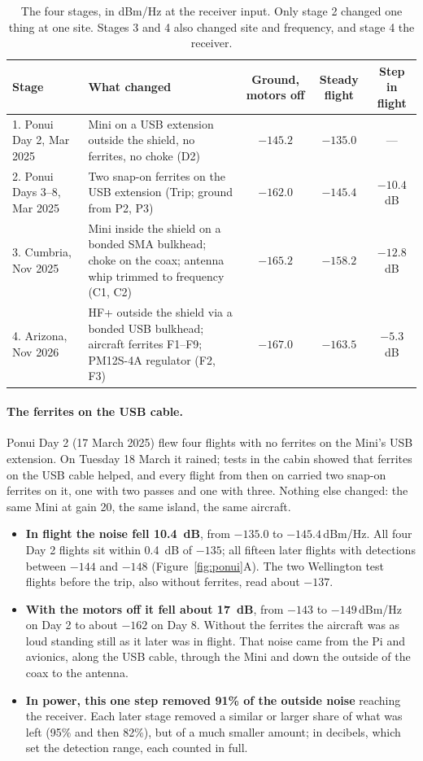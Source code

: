 \documentclass[11pt]{article}
\newcommand{\dBmHz}{\,dBm/Hz}
\begin{document}
\begin{table}[!htbp]
\centering\small
\begin{tabularx}{\linewidth}{@{}l X c c c@{}}
\toprule
Stage & What changed & Ground, motors off & Steady flight & Step in flight \\
\midrule
1. Ponui Day 2, Mar 2025 & Mini on a USB extension outside the shield, no ferrites, no choke (D2) & $-145.2$ & $-135.0$ & --- \\
2. Ponui Days 3--8, Mar 2025 & Two snap-on ferrites on the USB extension (Trip; ground from P2, P3) & $-162.0$ & $-145.4$ & $-10.4$ dB \\
3. Cumbria, Nov 2025 & Mini inside the shield on a bonded SMA bulkhead; choke on the coax; antenna whip trimmed to frequency (C1, C2) & $-165.2$ & $-158.2$ & $-12.8$ dB \\
4. Arizona, Nov 2026 & HF+ outside the shield via a bonded USB bulkhead; aircraft ferrites F1--F9; PM12S-4A regulator (F2, F3) & $-167.0$ & $-163.5$ & $-5.3$ dB \\
\bottomrule
\end{tabularx}
\caption{The four stages, in dBm/Hz at the receiver input. Only stage 2 changed one thing at one
site. Stages 3 and 4 also changed site and frequency, and stage 4 the receiver.}
\label{tab:history}
\end{table}

\paragraph{The ferrites on the USB cable.} Ponui Day 2 (17 March 2025) flew four flights with no
ferrites on the Mini's USB extension. On Tuesday 18 March it rained; tests in the cabin showed that
ferrites on the USB cable helped, and every flight from then on carried two snap-on ferrites on it,
one with two passes and one with three. Nothing else changed: the same Mini at gain 20, the same
island, the same aircraft.
\begin{itemize}
\item \textbf{In flight the noise fell 10.4~dB}, from $-135.0$ to $-145.4$\dBmHz{}. All four Day 2
flights sit within 0.4~dB of $-135$; all fifteen later flights with detections between $-144$ and
$-148$ (Figure~\ref{fig:ponui}A). The two Wellington test flights before the trip, also without
ferrites, read about $-137$.
\item \textbf{With the motors off it fell about 17~dB}, from $-143$ to $-149$\dBmHz{} on Day 2 to
about $-162$ on Day 8. Without the ferrites the aircraft was as loud standing still as it later was
in flight. That noise came from the Pi and avionics, along the USB cable, through the Mini and down
the outside of the coax to the antenna.
\item \textbf{In power, this one step removed 91\% of the outside noise} reaching the receiver.
Each later stage removed a similar or larger share of what was left (95\% and then 82\%), but of a
much smaller amount; in decibels, which set the detection range, each counted in full.
\end{itemize}
\end{document}
